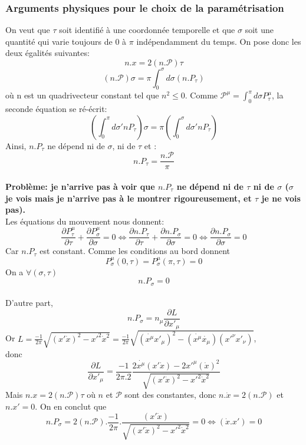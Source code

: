 \documentclass[a4paper,12pt]{article}
\def\xmu{x^\mu}
\begin{document}
\subsubsection{Arguments physiques pour le choix de la paramétrisation}
On veut que $\tau$ soit identifié à une coordonnée temporelle et que $\sigma$ soit une quantité qui varie toujours de $0$ à $\pi$ indépendamment du temps.
On pose donc les deux égalités suivantes:
$$n.x=2(n.\mathcal{P})\tau$$
$$(n.\mathcal{P})\sigma=\pi\int_0^\sigma d\sigma (n.P_\tau)$$
où n est un quadrivecteur constant tel que $n^2\leq0$.
Comme $\mathcal{P^\mu}=\int_0^\pi d\sigma P_\tau^\mu$, la seconde équation se ré-écrit:
$$\left( \int_0^\pi d\sigma' nP_\tau\right) \sigma=\pi\left( \int_0^\sigma d\sigma'nP_\tau\right) $$
Ainsi, $n.P_\tau$ ne dépend ni de $\sigma$, ni de $\tau$ et :
$$n.P_\tau=\frac{n.\mathcal{P}}{\pi}$$\\
\textbf{Problème: je n'arrive pas à voir que $n.P_\tau$ ne dépend ni de $\tau$ ni de $\sigma$ ($\sigma$ je vois mais je n'arrive pas à le montrer rigoureusement, et $\tau$ je ne vois pas).}\\
Les équations du mouvement nous donnent:
$$\frac{\partial P^{\mu}_{\tau}}{\partial \tau}+\frac{\partial P^{\mu}_{\sigma}}{\partial \sigma}=0 \Leftrightarrow \frac{\partial n.P_{\tau}}{\partial \tau}+\frac{\partial n.P_{\sigma}}{\partial \sigma}=0 \Leftrightarrow \frac{\partial n.P_{\sigma}}{\partial \sigma}=0$$
Car $n.P_\tau$ est constant.
Comme les conditions au bord donnent
$$P_\sigma^\mu(0,\tau)=P_\sigma^\mu(\pi,\tau)=0$$
On a $\forall (\sigma,\tau)$ $$n.P_\sigma=0 $$\\
D'autre part, 
$$n.P_\sigma=n_\mu \frac{\partial L}{\partial x'_\mu }$$
Or $L=\frac{-1}{2\pi}\sqrt{(x'\dot{x})^2-x'^2\dot{x}^2}=\frac{-1}{2\pi}\sqrt{(\dot{\xmu}x'_\mu)^2-(\dot{\xmu}\dot{x_\mu})(x'^\nu x'_\nu)}$,\\
donc
$$\frac{\partial L}{\partial x'_\mu }=\frac{-1}{2\pi.2}\frac{2\dot{\xmu}(x'\dot{x})-2x'^\mu (\dot{x})^2}{\sqrt{(x'\dot{x})^2-x'^2\dot{x}^2}}$$
Mais $n.x=2(n.\mathcal{P})\tau$ où $n$ et $\mathcal{P}$ sont des constantes,
donc $n.\dot{x}=2(n.\mathcal{P})$ et $n.x'=0$.
On en conclut que $$n.P_\sigma=2(n.\mathcal{P}).\frac{-1}{2\pi}.\frac{(x'\dot{x})}{\sqrt{(x'\dot{x})^2-x'^2\dot{x}^2}}=0 \Leftrightarrow (\dot{x}.x')=0$$
\end{document}
